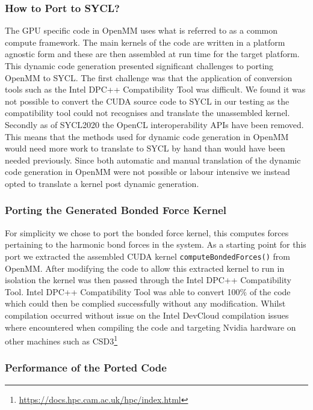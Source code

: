 \subsubsection{How to Port to SYCL?}\label{sec:openmm_howtoport}

The GPU specific code in OpenMM uses what is referred to as a common compute framework.
The main kernels of the code are written in a platform agnostic form and these are then assembled at run time for the target platform.
This dynamic code generation presented significant challenges to porting OpenMM to SYCL.
The first challenge was that the application of conversion tools such as the Intel DPC++ Compatibility Tool was difficult.
We found it was not possible to convert the CUDA source code to SYCL in our testing as the compatibility tool could not recognises and translate the unassembled kernel.
Secondly as of SYCL2020 the OpenCL interoperability APIs have been removed.
This means that the methods used for dynamic code generation in OpenMM would need more work to translate to SYCL by hand than would have been needed previously.
Since both automatic and manual translation of the dynamic code generation in OpenMM were not possible or labour intensive we instead opted to translate a kernel post dynamic generation.

\subsubsection{Porting the Generated Bonded Force Kernel}\label{sec:openmm_porting_genbf_kernel}

For simplicity we chose to port the bonded force kernel, this computes forces pertaining to the harmonic bond forces in the system.
As a starting point for this port we extracted the assembled CUDA kernel \verb!computeBondedForces()! from OpenMM.
After modifying the code to allow this extracted kernel to run in isolation the kernel was then passed through the Intel DPC++ Compatibility Tool.
Intel DPC++ Compatibility Tool was able to convert 100$\%$ of the code which could then be complied successfully without any modification.
Whilst compilation occurred without issue on the Intel DevCloud compilation issues where encountered when compiling the code and targeting Nvidia hardware on other machines such as CSD3\footnote{\url{https://docs.hpc.cam.ac.uk/hpc/index.html}}

\subsubsection{Performance of the Ported Code}\label{sec:openmm_performance}

